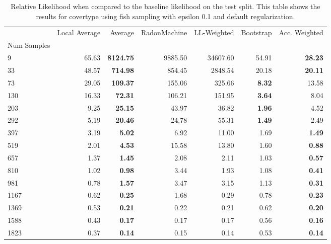\begin{table}
\centering
\caption{Relative Likelihood when compared to the baseline likelihood on the test split. This table shows the results for  covertype using  fish sampling with epsilon  0.1 and  default regularization.}
\label{tab:0}
\begin{tabular}{|l||r|rrr||rr|}
\toprule
{} &  Local Average &  Average &  RadonMachine &  LL-Weighted &  Bootstrap &  Acc. Weighted \\
Num Samples &                &          &               &              &            &                \\
\midrule
9      &          65.63 &  \textbf{8124.75} &       9885.50 &     34607.60 &      54.91 &          \textbf{28.23} \\
33     &          48.57 &  \textbf{ 714.98} &        854.45 &      2848.54 &      20.18 &          \textbf{20.11} \\
73     &          29.05 &  \textbf{ 109.37} &        155.06 &       325.66 &       \textbf{8.32} &          13.58 \\
130    &          16.33 &  \textbf{  72.31} &        106.21 &       151.95 &       \textbf{3.64} &           8.04 \\
203    &           9.25 &  \textbf{  25.15} &         43.97 &        36.82 &       \textbf{1.96} &           4.52 \\
292    &           5.19 &  \textbf{  20.46} &         24.78 &        55.31 &       \textbf{1.49} &           2.49 \\
397    &           3.19 &  \textbf{   5.02} &          6.92 &        11.00 &       1.69 &           \textbf{1.49} \\
519    &           2.01 &  \textbf{   4.53} &         15.58 &        13.80 &       1.60 &           \textbf{0.88} \\
657    &           1.37 &  \textbf{   1.45} &          2.08 &         2.11 &       1.03 &           \textbf{0.57} \\
810    &           1.02 &  \textbf{   0.98} &          3.44 &         1.93 &       1.08 &           \textbf{0.41} \\
981    &           0.78 &  \textbf{   1.57} &          3.47 &         3.15 &       1.13 &           \textbf{0.31} \\
1167   &           0.62 &  \textbf{   0.25} &          1.68 &         0.29 &       0.78 &           \textbf{0.23} \\
1369   &           0.53 &  \textbf{   0.21} &          0.22 &         0.21 &       0.62 &           \textbf{0.20} \\
1588   &           0.43 &  \textbf{   0.17} &          0.17 &         0.17 &       0.56 &           \textbf{0.16} \\
1823   &           0.37 &  \textbf{   0.14} &          0.15 &         0.14 &       0.53 &           \textbf{0.14} \\
\bottomrule
\end{tabular}
\end{table}
